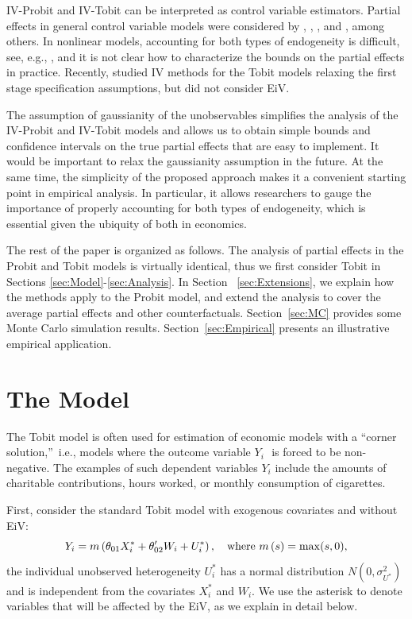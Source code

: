 \documentclass[11pt]{article}
\begin{document}
IV-Probit and IV-Tobit can be interpreted as control variable estimators.
Partial effects in general control variable models were considered by \cite%
{BlundellPowell2003Advances}, \cite{Chesher2003Ecta}, \cite%
{ImbensNewey2009Ecta}, and \cite{Wooldridge2005APE,Wooldridge2015JHR}, among
others. In nonlinear models, accounting for both types of endogeneity is
difficult, see, e.g., \cite{Schennach2022JEcLit}, and it is not clear how to
characterize the bounds on the partial effects in practice. Recently, \cite%
{ChesherKimRosen2023JoE} studied IV methods for the Tobit models relaxing
the first stage specification assumptions, but did not consider EiV.

The assumption of gaussianity of the unobservables simplifies the analysis
of the IV-Probit and IV-Tobit models and allows us to obtain simple bounds
and confidence intervals on the true partial effects that are easy to
implement. It would be important to relax the gaussianity assumption in the
future. At the same time, the simplicity of the proposed approach makes it a
convenient starting point in empirical analysis. 
In particular, it allows researchers to gauge the importance of properly
accounting for both types of endogeneity, which is essential given the
ubiquity of both in economics.

The rest of the paper is organized as follows. The analysis of partial
effects in the Probit and Tobit models is virtually identical, thus we first
consider Tobit in Sections \ref{sec:Model}-\ref{sec:Analysis}. In Section~%
\ref{sec:Extensions}, we explain how the methods apply to the Probit model,
and extend the analysis to cover the average partial effects and other
counterfactuals. Section~\ref{sec:MC} provides some Monte Carlo simulation
results. Section~\ref{sec:Empirical} presents an illustrative empirical
application.

\section{The Model\label{sec:Model}}

The Tobit model is often used for estimation of economic models with a
\textquotedblleft corner solution,\textquotedblright\ i.e., models where the
outcome variable $Y_{i}\,$\ is forced to be non-negative. The examples of
such dependent variables $Y_{i}$ include the amounts of charitable
contributions, hours worked, or monthly consumption of cigarettes.

First, consider the standard Tobit model with exogenous covariates and
without EiV:%
\begin{equation}
Y_{i}=m\left( \theta _{01}X_{i}^{\ast }+\theta _{02}^{\prime
}W_{i}+U_{i}^{\ast }\right) ,\text{\quad where }m\left( s\right) =\max (s,0),
\label{eq:dgp Y exog copy}
\end{equation}%
the individual unobserved heterogeneity $U_{i}^{\ast }$ has a normal
distribution $N\left( 0,\sigma _{U^{\ast }}^{2}\right) $ and is independent
from the covariates $X_{i}^{\ast }$ and $W_{i}$. We use the asterisk to
denote variables that will be affected by the EiV, as we explain in detail
below.{}
\end{document}

